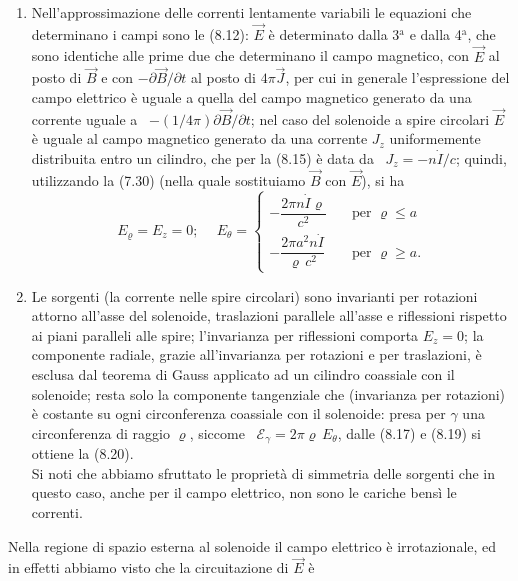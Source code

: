 \begin{enumerate}
  \item Nell'approssimazione delle correnti lentamente variabili le equazioni
    che determinano i campi sono le (8.12): $\vec E$ \`e determinato dalla
    3$^\mathrm{a}$ e dalla 4$^\mathrm{a}$, che sono identiche alle prime due che
    determinano il campo magnetico, con $\vec E$ al posto di $\vec B$ e con
    $-\partial\vec B/\partial t$ al posto di $4\pi\vec J$, per cui in generale
    l'espressione del campo elettrico \`e uguale a quella del campo magnetico
    generato da una corrente uguale a \ $-(1/4\pi)\partial\vec B/\partial t$;
    nel caso del solenoide a spire circolari $\vec E$ \`e uguale al campo
    magnetico generato da una corrente $J_z$ uniformemente distribuita entro un
    cilindro, che per la (8.15) \`e data da \ $J_z=-n\dot I/c$; quindi,
    utilizzando la (7.30) (nella quale sostituiamo $\vec B$ con $\vec E$), si ha
    \begin{equation}
      E_\varrho=E_z=0;\quad\ E_\theta=\left\{\begin{array}{ll}
        -\dfrac{2\pi n\dot I\varrho}{c^2}&\quad\text{per }\varrho\le a\\[12pt]
        -\dfrac{2\pi a^2n\dot I}{\varrho\,c^2}&\quad\text{per }\varrho\ge a.
      \end{array}\right.
      \tag{8.20}
    \end{equation}
  \item Le sorgenti (la corrente nelle spire circolari) sono invarianti per
    rotazioni attorno all'asse del solenoide, traslazioni parallele all'asse e
    riflessioni rispetto ai piani paralleli alle spire; l'invarianza per
    riflessioni comporta $E_z=0$; la componente radiale, grazie all'invarianza
    per rotazioni e per traslazioni, \`e esclusa dal teorema di Gauss applicato
    ad un cilindro coassiale con il solenoide; resta solo la componente
    tangenziale che (invarianza per rotazioni) \`e costante su ogni
    circonferenza coassiale con il solenoide: presa per $\gamma$ una
    circonferenza di raggio $\varrho$, siccome
    \ $\mathcal E_\gamma=2\pi\varrho\,E_\theta$, dalle (8.17) e (8.19) si
    ottiene la (8.20).\\
    Si noti che abbiamo sfruttato le propriet\`a di simmetria delle sorgenti che
    in questo caso, anche per il campo elettrico, non sono le cariche bens\`i le
    correnti.
\end{enumerate}
Nella regione di spazio esterna al solenoide il campo elettrico \`e
irrotazionale, ed in effetti abbiamo visto che la circuitazione di $\vec E$ \`e
